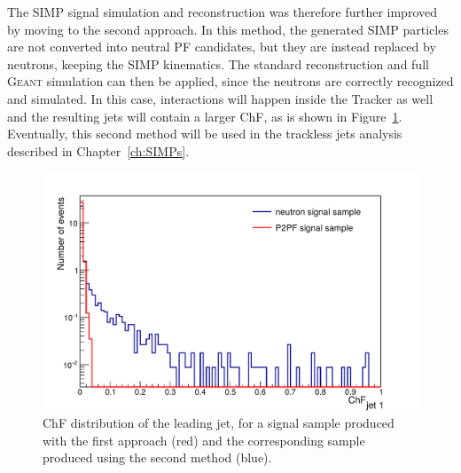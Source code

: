 The \ac{SIMP} signal simulation and reconstruction was therefore further improved by moving to the second approach. In this method, the generated \ac{SIMP} particles are not converted into neutral \ac{PF} candidates, but they are instead replaced by neutrons, keeping the \ac{SIMP} kinematics. The standard reconstruction and full \textsc{Geant} simulation can then be applied, since the neutrons are correctly recognized and simulated. In this case, interactions will happen inside the Tracker as well and the resulting jets will contain a larger ChF, as is shown in Figure~\ref{fig:neutron_chf}. Eventually, this second method will be used in the trackless jets analysis described in Chapter~\ref{ch:SIMPs}.
 
\begin{figure}[ht]
  \centering
 \includegraphics[width=.75\textwidth]{ChF_neutrons.pdf} 
 \caption{ChF distribution of the leading jet, for a signal sample produced with the first approach (red) and the corresponding sample produced using the second method (blue).}
 \label{fig:neutron_chf}
\end{figure}

